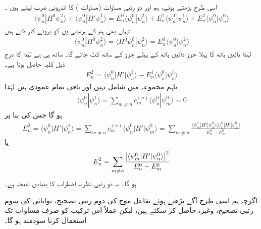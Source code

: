  اسی طرح بڑھتے ہوئے،  ہم  اور دو رتبی مساوات (مساوات ) کا اندرونی ضرب لیتے ہیں ۔
\begin{align*}
\langle \psi_n^0 | H^0 \psi_n^2 \rangle + \langle \psi_n^0 | H' \psi_n^1 \rangle = E_n^0 \langle \psi_n^0 | \psi_n^2 \rangle + E_n^1 \langle \psi_n^0 | \psi_n^1 \rangle + E_n^2 \langle \psi_n^0 | \psi_n^0 \rangle
\end{align*}
یہاں بھی ہم  کے ہرمشی پن کو بروئے کار لاتے ہیں: 
\begin{align*}
\langle \psi_n^0 | H^0 \psi_n^2 \rangle = \langle H^0 \psi_n^0 | \psi_n^2 \rangle = E_n^0 \langle \psi_n^0 | \psi_n^2 \rangle
\end{align*}
 لہٰذا  بائیں ہاتھ کا پہلا جزو دائیں ہاتھ کے پہلے جزو کے ساتھ کٹ جائے گا۔   ساتھ   ہی  ہے    لہٰذا     کا درج ذیل  کلیہ حاصل ہوتا ہے۔
\begin{align}\label{مساوات_غیر_مضطرب_دوم_رتبی_تصحیح}
E_n^2 = \langle \psi_n^0 | H' | \psi_n^1 \rangle - E_n^1 \langle \psi_n^0 | \psi_n^1 \rangle
\end{align}
تاہم  مجموعہ  میں  شامل نہیں  اور  باقی تمام عمودی ہیں  لہٰذا  
\begin{align*}
\langle \psi_n^0 | \psi_n^1 \rangle  = \sum_{m \ne n} c_m^{(n)} \langle \psi_n^0 | \psi_m^0 \rangle = 0
\end{align*}
 ہو گا جس کی بنا پر 
\begin{align*}
E_n^2 = \langle \psi_n^0 | H' | \psi_n^1 \rangle = \sum_{m \ne n} c_m^{(n)} \langle \psi_n^0 | H' | \psi_m^0 \rangle = \sum_{m \ne n} \frac{\langle \psi_m^0 | H' | \psi_n^0 \rangle \langle \psi_n^0 | H' | \psi_m^0 \rangle }{E_n^0 - E_m^0}
\end{align*}
یا  
\begin{align}\label{مساوات_غیر_اضطراب_دوم_رتبی_نتیجہ}
E_n^2 = \sum_{m \ne n} \frac{ \abs{ \langle \psi_m^0 | H' | \psi_n^0\rangle }^2 }{E_n^0 - E_m^0}
\end{align}
 ہو گا۔ یہ  دو رتبی نظریہ اضطراب کا بنیادی نتیجہ ہے۔

 اگرچہ ہم اسی طرح آگے بڑھتے ہوئے تفاعل موج      کی  دوم رتبی تصحیح،  توانائی کی سوم  رتبی تصحیح،  وغیرہ  حاصل کر سکتے ہیں،  لیکن عملاً اس ترکیب کو صرف مساوات  تک استعمال کرنا سودمند  ہو گا۔
 
